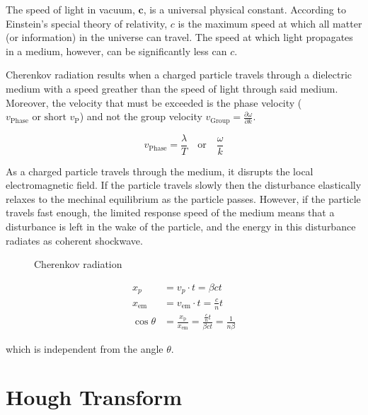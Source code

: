 \documentclass[10pt,twoside]{scrreprt}
\begin{document}
The speed of light in vacuum, \( \mathbf{c} \), is a universal physical constant. According to Einstein's special theory of relativity, \( c \) is the maximum speed at which all matter (or information) in the universe can travel. The speed at which light propagates in a medium, however, can be significantly less can \( c \).

Cherenkov radiation results when a charged particle travels through a dielectric medium with a speed greather than the speed of light through said medium. Moreover, the velocity that must be exceeded is the phase velocity (\( v_{\text{Phase}} \text{ or short } v_{\text{P}} \)) and not the group velocity \( v_{\text{Group}} = \frac{\partial \omega}{\partial k} \).

\[ v_{\text{Phase}} = \frac{\lambda}{T} \quad \text{or} \quad \frac{\omega}{k}\]

As a charged particle travels through the medium, it disrupts the local electromagnetic field. If the particle travels slowly then the disturbance elastically relaxes to the mechinal equilibrium as the particle passes. However, if the particle travels fast enough, the limited response speed of the medium means that a disturbance is left in the wake of the particle, and the energy in this disturbance radiates as coherent shockwave.

\begin{figure}[htbp]
	\centering
	\caption{Cherenkov radiation}
	\label{fig:label}
\end{figure}

\begin{align}
    x_p &= v_{p}\cdot t = \beta c t \nonumber \\
    x_{\text{em}} &= v_{\text{em}}\cdot t=\frac{c}{n}t \nonumber \\
    \cos\theta &= \frac{x_{\text{p}}}{x_{\text{em}}} = \frac{\frac{c}{n}t}{\beta c t} = \frac{1}{n\beta} \nonumber
\end{align}

which is independent from the angle \( \theta \).

\section{Hough Transform} %
\label{sec:hough_transform}
\end{document}
